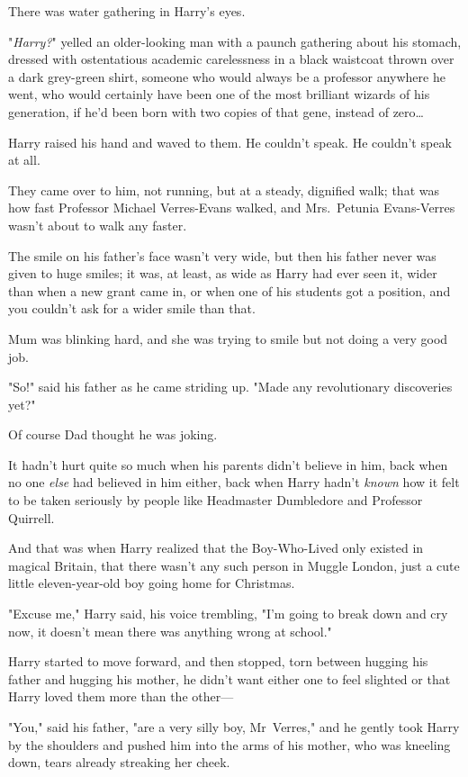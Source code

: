 There was water gathering in Harry's eyes.

"\emph{Harry?}" yelled an older-looking man with a paunch gathering about his
stomach, dressed with ostentatious academic carelessness in a black waistcoat thrown
over a dark grey-green shirt, someone who would always be a professor anywhere
he went, who would certainly have been one of the most brilliant wizards of his
generation, if he'd been born with two copies of that gene, instead of
zero{\ldots}

Harry raised his hand and waved to them. He couldn't speak. He couldn't speak
at all.

They came over to him, not running, but at a steady, dignified walk; that was
how fast Professor Michael Verres-Evans walked, and Mrs.~Petunia Evans-Verres
wasn't about to walk any faster.

The smile on his father's face wasn't very wide, but then his father never was
given to huge smiles; it was, at least, as wide as Harry had ever seen it,
wider than when a new grant came in, or when one of his students got a
position, and you couldn't ask for a wider smile than that.

Mum was blinking hard, and she was trying to smile but not doing a very good
job.

"So!" said his father as he came striding up. "Made any revolutionary
discoveries yet?"

Of course Dad thought he was joking.

It hadn't hurt quite so much when his parents didn't believe in him, back when
no one \emph{else} had believed in him either, back when Harry hadn't
\emph{known} how it felt to be taken seriously by people like Headmaster
Dumbledore and Professor Quirrell.

And that was when Harry realized that the Boy-Who-Lived only existed in magical
Britain, that there wasn't any such person in Muggle London, just a cute little
eleven-year-old boy going home for Christmas.

"Excuse me," Harry said, his voice trembling, "I'm going to break down and cry
now, it doesn't mean there was anything wrong at school."

Harry started to move forward, and then stopped, torn between hugging his
father and hugging his mother, he didn't want either one to feel slighted or
that Harry loved them more than the other---

"You," said his father, "are a very silly boy, Mr~Verres," and he gently took
Harry by the shoulders and pushed him into the arms of his mother, who was
kneeling down, tears already streaking her cheek.

